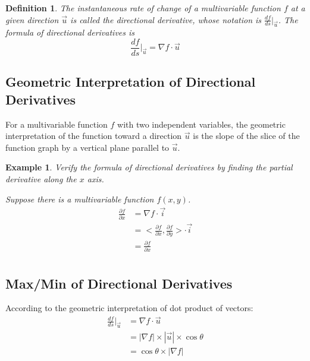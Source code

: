 \documentclass{article}
\newtheorem*{definition}{Definition}
\newtheorem{example}{Example}
\begin{document}
\begin{definition}
  The instantaneous rate of change of a multivariable function $f$ at a given 
  direction $\vec{u}$ is called the directional derivative, whose notation is 
  $\frac{df}{ds}|_{\vec{u}}$. The formula of directional derivatives is 
  \[ \frac{df}{ds}|_{\vec{u}} = \nabla f \cdot \vec{u} \]
\end{definition}

\subsection{Geometric Interpretation of Directional Derivatives}

For a multivariable function $f$ with two independent variables, the geometric 
interpretation of the function toward a direction $\vec{u}$ is the slope of the 
slice of the function graph by a vertical plane parallel to $\vec{u}$.

\begin{example}
  Verify the formula of directional derivatives by finding the partial 
  derivative along the $x$ axis.

  Suppose there is a multivariable function $f(x, y)$.
  \begin{equation*}
    \begin{split}
      \frac{\partial f}{\partial x} &= \nabla f \cdot \vec{i} \\
                                    &= <\frac{\partial f}{\partial x}, \frac{\partial f}{\partial y}> \cdot \vec{i} \\
                                    &= \frac{\partial f}{\partial x} \\
    \end{split}
  \end{equation*}
\end{example}

\subsection{Max/Min of Directional Derivatives}

According to the geometric interpretation of dot product of vectors:
\begin{equation*}
  \begin{split}
    \frac{df}{ds}|_{\vec{u}} &= \nabla f \cdot \vec{u} \\
                             &= |\nabla f| \times |\vec{u}| \times \cos\theta \\
                             &= \cos\theta \times |\nabla f| \\
  \end{split}
\end{equation*}
\end{document}

